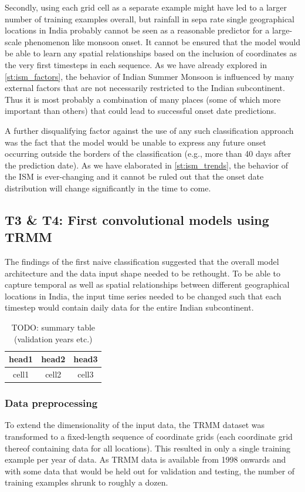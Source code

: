 Secondly, using each grid cell as a separate example might have led to a larger number of training examples overall, but rainfall in sepa rate single geographical locations in India probably cannot be seen as a reasonable predictor for a large-scale phenomenon like monsoon onset. It cannot be ensured that the model would be able to learn any spatial relationships based on the inclusion of coordinates as the very first timesteps in each sequence. As we have already explored in \cref{st:ism_factors}, the behavior of Indian Summer Monsoon is influenced by many external factors that are not necessarily restricted to the Indian subcontinent. Thus it is most probably a combination of many places (some of which more important than others) that could lead to successful onset date predictions.

A further disqualifying factor against the use of any such classification approach was the fact that the model would be unable to express any future onset occurring outside the borders of the classification (e.g., more than 40 days after the prediction date). As we have elaborated in \cref{st:ism_trends}, the behavior of the ISM is ever-changing and it cannot be ruled out that the onset date distribution will change significantly in the time to come.


\clearpage
\subsection{T3 \& T4: First convolutional models using TRMM}
\label{sst:nn_t3}
The findings of the first naive classification suggested that the overall model architecture and the data input shape needed to be rethought. To be able to capture temporal as well as spatial relationships between different geographical locations in India, the input time series needed to be changed such that each timestep would contain daily data for the entire Indian subcontinent.

\begin{table}[h]
  \centering
  \begin{tabular}{ |c|c|c| }
    \hline
    head1 & head2 & head3 \\
    \hline
    cell1 & cell2 & cell3 \\
    \hline
  \end{tabular}
  \caption{TODO: summary table (validation years etc.)}
  \label{tab:nn_t3_summary}
\end{table}

\subsubsection{Data preprocessing}
\label{ssst:nn_t3_data}
To extend the dimensionality of the input data, the TRMM dataset was transformed to a fixed-length sequence of coordinate grids (each coordinate grid thereof containing data for all locations). This resulted in only a single training example per year of data. As TRMM data is available from 1998 onwards and with some data that would be held out for validation and testing, the number of training examples shrunk to roughly a dozen.


